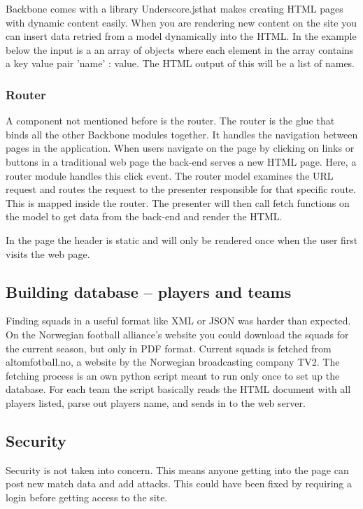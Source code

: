 Backbone comes with a library Underscore.js\footnotemark that makes creating HTML pages with dynamic content easily. When you are rendering new content on the site you can insert data retried from a model dynamically into the HTML. In the example below the input is a an array of objects where each element in the array contains a key value pair 'name' : value. The HTML output of this will be a list of names.



\subsubsection{Router}

A component not mentioned before is the router. The router is the glue that binds all the other Backbone modules together. It handles the navigation between pages in the application. When users navigate on the page by clicking on links or buttons in a traditional web page the back-end serves a new HTML page. Here, a router module handles this click event. The router model examines the URL request and routes the request to the presenter responsible for that specific route. This is mapped inside the router. The presenter will then call fetch functions on the model to get data from the back-end and render the HTML.

In the page the header is static and will only be rendered once when the user first visits the web page. 

\subsection{Building database – players and teams}

Finding squads in a useful format like \ac{XML} or \ac{JSON} was harder than expected. On the Norwegian football alliance's website you could download the squads for the current season, but only in PDF format. Current squads is fetched from altomfotball.no, a website by the Norwegian broadcasting company TV2. The fetching process is an own python script meant to run only once to set up the database. For each team the script basically reads the HTML document with all players listed, parse out players name, and sends in to the web server.

\subsection{Security}
Security is not taken into concern. This means anyone getting into the page can post new match data and add attacks. This could have been fixed by requiring a login before getting access to the site. 







